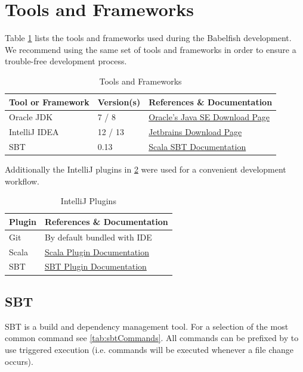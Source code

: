 \section{Tools and Frameworks}
Table \ref{tab:tools} lists the tools and frameworks used during the Babelfish development.
We recommend using the same set of tools and frameworks in order to ensure a trouble-free development process.
\begin{table}[hp]
\begin{tabularx}{\textwidth}{llX}
\toprule
Tool or Framework & Version(s) & References \& Documentation\\
\midrule
Oracle JDK & 7 / 8 & \href{http://www.oracle.com/technetwork/java/javase/downloads/index.html}{Oracle's Java SE Download Page} \\
IntelliJ IDEA & 12 / 13 & \href{http://www.jetbrains.com/idea/download/index.html}{Jetbrains Download Page}\\
\Gls{SBT} & 0.13 & \href{http://www.scala-sbt.org/}{Scala SBT Documentation}\\
\bottomrule
\end{tabularx}
\caption{Tools and Frameworks}\label{tab:tools}
\end{table}

Additionally the IntelliJ plugins in \cref{tab:plugins} were used for a convenient development workflow.

\begin{table}[hp]
\begin{tabularx}{\textwidth}{lX}
\toprule
Plugin & References \& Documentation\\
\midrule
Git & By default bundled with IDE\\
Scala & \href{http://confluence.jetbrains.com/display/SCA/Scala+Plugin+for+IntelliJ+IDEA}{Scala Plugin Documentation}\\
\Gls{SBT} & \href{https://github.com/orfjackal/idea-sbt-plugin/wiki}{SBT Plugin Documentation}\\
\bottomrule
\end{tabularx}
\caption{IntelliJ Plugins}\label{tab:plugins}
\end{table}

\subsection{SBT}
\Gls{SBT} is a build and dependency management tool. For a selection of the most common command see \cref{tab:sbtCommands}.
All commands can be prefixed by \code{\~} to use triggered execution (i.e. commands will be executed whenever a file change occurs).

